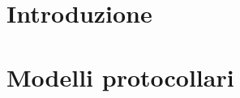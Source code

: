 \documentclass[12 pt]{article}
\begin{document}
\newgeometry{}

\tableofcontents
\restoregeometry

\section{Introduzione}


\section{Modelli protocollari}

\end{document}
